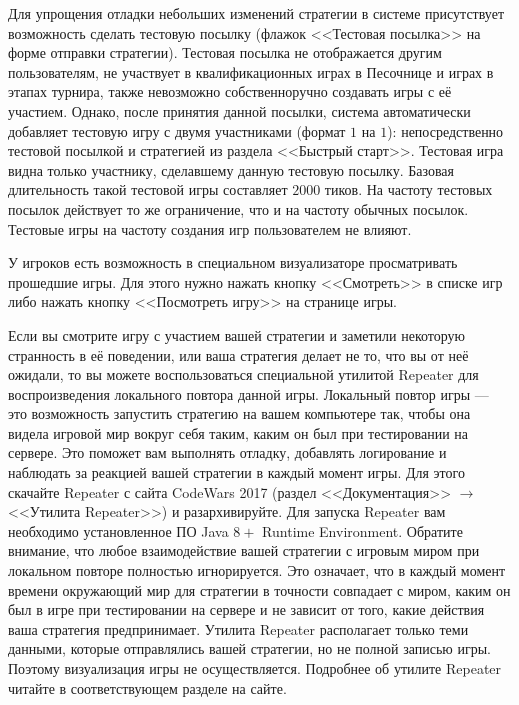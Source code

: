 Для упрощения отладки небольших изменений стратегии в системе присутствует возможность сделать тестовую посылку (флажок <<Тестовая посылка>>
на форме отправки стратегии). Тестовая посылка не отображается другим пользователям, не участвует в квалификационных играх в Песочнице и
играх в этапах турнира, также невозможно собственноручно создавать игры с её участием. Однако, после принятия данной посылки, система
автоматически добавляет тестовую игру с двумя участниками (формат $1$ на $1$): непосредственно тестовой посылкой и стратегией из раздела
<<Быстрый старт>>. Тестовая игра видна только участнику, сделавшему данную тестовую посылку. Базовая длительность такой тестовой игры
составляет $2000$ тиков. На частоту тестовых посылок действует то же ограничение, что и на частоту обычных посылок. Тестовые игры на частоту
создания игр пользователем не влияют.

У игроков есть возможность в специальном визуализаторе просматривать прошедшие игры. Для этого нужно нажать кнопку <<Смотреть>> в списке игр
либо нажать кнопку <<Посмотреть игру>> на странице игры.

Если вы смотрите игру с участием вашей стратегии и заметили некоторую странность в её поведении, или ваша стратегия делает не то, что вы от
неё ожидали, то вы можете воспользоваться специальной утилитой Repeater для воспроизведения локального повтора данной игры. Локальный повтор
игры --- это возможность запустить стратегию на вашем компьютере так, чтобы она видела игровой мир вокруг себя таким, каким он был при
тестировании на сервере. Это поможет вам выполнять отладку, добавлять логирование и наблюдать за реакцией вашей стратегии в каждый момент
игры. Для этого скачайте Repeater с сайта CodeWars 2017 (раздел <<Документация>> $\rightarrow$ <<Утилита Repeater>>) и разархивируйте.
Для запуска Repeater вам необходимо установленное ПО Java $8+$ Runtime Environment. Обратите внимание, что любое взаимодействие вашей
стратегии с игровым миром при локальном повторе полностью игнорируется. Это означает, что в каждый момент времени окружающий мир для
стратегии в точности совпадает с миром, каким он был в игре при тестировании на сервере и не зависит от того, какие действия ваша стратегия
предпринимает. Утилита Repeater располагает только теми данными, которые отправлялись вашей стратегии, но не полной записью игры. Поэтому
визуализация игры не осуществляется. Подробнее об утилите Repeater читайте в соответствующем разделе на сайте.

